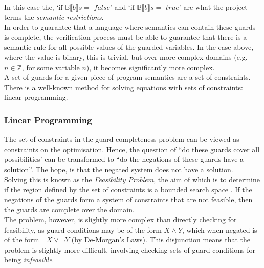 In this case the, `$\text{if } \mathbb{B}\llbracket b \rrbracket s = \textit{ false}$' and `$\text{if }\mathbb{B}\llbracket b \rrbracket s = \textit{ true}$' are what the project terms the \textit{semantic restrictions}.\\

In order to guarantee that a language where semantics can contain these guards is complete, the verification process must be able to guarantee that there is a semantic rule for all possible values of the guarded variables.
In the case above, where the value is binary, this is trivial, but over more complex domains (e.g. $n \in \mathbb{Z}$, for some variable $n$), it becomes significantly more complex.\\

A set of guards for a given piece of program semantics are a set of constraints.
There is a well-known method for solving equations with sets of constraints: linear programming.

\subsubsection{Linear Programming} %
\label{ssub:linear_programming}

The set of constraints in the guard completeness problem can be viewed as constraints on the optimisation.
Hence, the question of ``do these guards cover all possibilities' can be transformed to ``do the negations of these guards have a solution''. 
The hope, is that the negated system does not have a solution.\\

Solving this is known as the \textit{Feasibility Problem}, the aim of which is to determine if the region defined by the set of constraints is a bounded search space \citep{luenberger2016simplex}. 
If the negations of the guards form a system of constraints that are not feasible, then the guards are complete over the domain. \\

The problem, however, is slightly more complex than directly checking for feasibility, as guard conditions may be of the form $X \land Y$, which when negated is of the form $\lnot X \lor \lnot Y$ (by De-Morgan's Laws).
This disjunction means that the problem is slightly more difficult, involving checking sets of guard conditions for being \textit{infeasible}.

